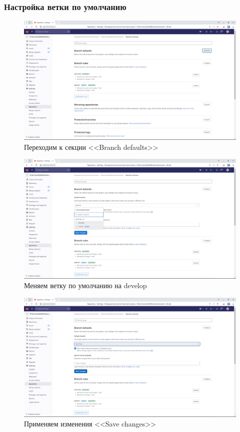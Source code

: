\documentclass[a4paper]{article}
\begin{document}
  \subsubsection{Настройка ветки по умолчанию}

  \begin{figure}[H]
    \centering
    \includegraphics[width=\textwidth]{1_ (35)}
    \caption{Переходим к секции <<Branch defaults>>}
  \end{figure}

  \begin{figure}[H]
    \centering
    \includegraphics[width=\textwidth]{1_ (34)}
    \caption{Меняем ветку по умолчанию на develop}
  \end{figure}

  \begin{figure}[H]
    \centering
    \includegraphics[width=\textwidth]{1_ (33)}
    \caption{Применяем изменения <<Save changes>>}
  \end{figure}
\end{document}
